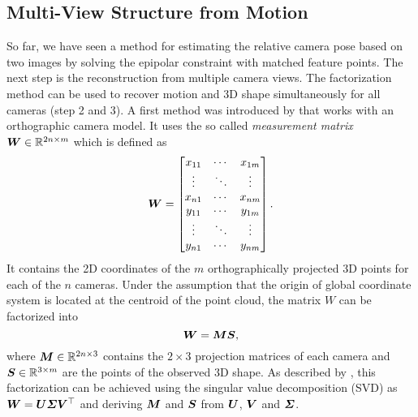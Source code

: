		\subsection{Multi-View Structure from Motion}
			So far, we have seen a method for estimating the relative camera pose  based on two images by solving the epipolar constraint with matched feature points.
			The next step is the reconstruction from multiple camera views.
			The factorization method can be used to recover motion and 3D shape simultaneously for all cameras (step 2 and 3).
			A first method was introduced by \cite{tomasi1992factorization} that works with an orthographic camera model.
			It uses the so called \emph{measurement matrix} $\bm{W} \in \mathbb{R}^{2n \times m}$ which is defined as
			\begin{equation}\label{eq:measurement_matrix}
				\bm{W} =
				\begin{bmatrix}
					x_{11} & \cdots & x_{1m} \\ 
					\vdots & \ddots & \vdots \\ 
					x_{n1} & \cdots & x_{nm} \\ 
					y_{11} & \cdots & y_{1m} \\ 
					\vdots & \ddots & \vdots \\ 
					y_{n1} & \cdots & y_{nm}
				\end{bmatrix}. 
			\end{equation}
			It contains the 2D coordinates of the $m$ orthographically projected 3D points for each of the $n$ cameras.
			Under the assumption that the origin of global coordinate system is located at the centroid of the point cloud, the matrix $W$ can be factorized into
			\begin{equation}\label{eq:factorization_method}
				\bm{W} = \bm{M} \bm{S},
			\end{equation}
			where $\bm{M} \in \mathbb{R}^{2n \times 3}$ contains the $2 \times 3$ projection matrices of each camera and $\bm{S} \in \mathbb{R}^{3 \times m}$  are the points of the observed 3D shape.
			As described by \cite{tomasi1992factorization}, this factorization can be achieved using the singular value decomposition (SVD) as $\bm{W} = \bm{U} \bm{\varSigma} \bm{V}^\top$ and deriving $\bm{M}$ and $\bm{S}$ from $\bm{U}$, $\bm{V}$ and $\bm{\varSigma}$.
			
